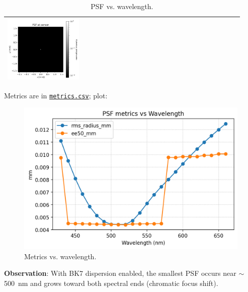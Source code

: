 \documentclass[11pt,a4paper]{article}
\begin{document}
\begin{table}[H]
\begin{tabular}{>{\centering\arraybackslash}m{0.31\linewidth} >{\centering\arraybackslash}m{0.31\linewidth} >{\centering\arraybackslash}m{0.31\linewidth}}
			\includegraphics[width=\linewidth,keepaspectratio]{sweep_lambda/biconvex_psf_610_log.png} \\
			\bottomrule
		\end{tabular}
		\caption{PSF vs. wavelength.}
	\end{table}
	
	Metrics are in \href{../out/sweep_lambda/metrics.csv}{\texttt{metrics.csv}}; plot:
	\begin{figure}[H]
		\centering
		\includegraphics[width=\linewidth]{sweep_lambda/metrics_vs_lambda_nm.png}
		\caption{Metrics vs. wavelength.}
	\end{figure}
	
	\textbf{Observation}: With BK7 dispersion enabled, the smallest PSF occurs near \(\sim\) \SI{500}{nm} and grows toward both spectral ends (chromatic focus shift).
	
\end{document}
